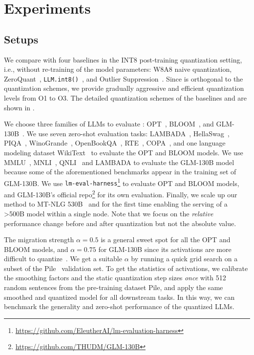 \section{Experiments}
\subsection{Setups}

We compare with four baselines in the INT8 post-training quantization setting, i.e., without re-training of the model parameters: W8A8 naive quantization, ZeroQuant~\cite{zeroquant},  \texttt{LLM.int8()}~\cite{dettmers2022llmint8}, and Outlier Suppression~\cite{outlier_suppression}. Since \method is orthogonal to the quantization schemes, we provide gradually aggressive and efficient quantization levels from O1 to O3. The detailed quantization schemes of the baselines and \method are shown in .


We choose three families of LLMs to evaluate \method: OPT~\cite{opt}, BLOOM~\cite{scao2022bloom}, and GLM-130B~\cite{zeng2022glm}.
We use seven zero-shot evaluation tasks: LAMBADA~\cite{paperno-etal-2016-lambada}, HellaSwag~\cite{hellaswag}, PIQA~\cite{Bisk2020piqa}, WinoGrande~\cite{sakaguchi2019winogrande}, OpenBookQA~\cite{OpenBookQA2018}, RTE~\cite{glue}, COPA~\cite{copa}, and one language modeling dataset WikiText~\cite{merity2016pointer} to evaluate the OPT and BLOOM models. We use MMLU~\cite{mmlu}, MNLI~\cite{mnli}, QNLI~\cite{glue} and LAMBADA to evaluate the GLM-130B model because some of the aforementioned benchmarks appear in the training set of GLM-130B.
We use {\texttt{lm-eval-harness}}\footnote{\url{https://github.com/EleutherAI/lm-evaluation-harness}} to evaluate OPT and BLOOM models, and GLM-130B's official repo\footnote{\url{https://github.com/THUDM/GLM-130B}} for its own evaluation. Finally, we scale up our method to MT-NLG 530B~\cite{smith2022using} and for the first time enabling the serving of a >500B model within a single node.
Note that we focus on the \emph{relative} performance change before and after quantization but not the absolute value.

 The migration strength $\alpha=0.5$ is a general sweet spot for all the OPT and BLOOM models, and $\alpha=0.75$ for GLM-130B since its activations are more difficult to quantize~\cite{zeng2022glm}.
We get a suitable $\alpha$ by running a quick grid search on a subset of the Pile~\cite{gao2020pile} validation set.
To get the statistics of activations, we calibrate the smoothing factors and the static quantization step sizes \emph{once} with 512 random sentences from the pre-training dataset Pile, and apply the same smoothed and quantized model for all downstream tasks. In this way, we can benchmark the generality and zero-shot performance of the quantized LLMs.


